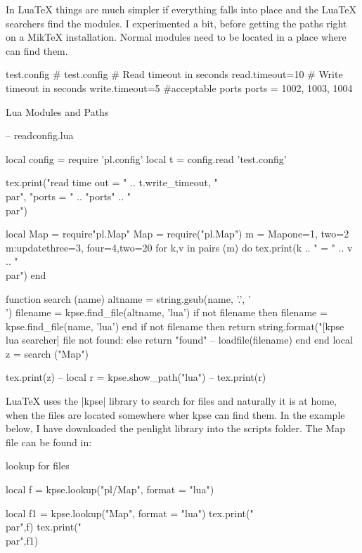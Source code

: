 In LuaTeX things are much simpler if everything falls into place and the LuaTeX searchers find the modules. I experimented a bit, before getting the paths right on a MikTeX installation. Normal modules need to be located in a place where \tex can find them.

\begin{filecontents*}{test.config}
    # test.config
    # Read timeout in seconds
    read.timeout=10
    # Write timeout in seconds
    write.timeout=5
   #acceptable ports
   ports = 1002, 1003, 1004
\end{filecontents*}

\begin{texexample}{Lua Modules and Paths}{}

\begin{luacode}
  -- readconfig.lua
  
local config       = require 'pl.config'
local t               = config.read 'test.config'

tex.print("read time out = " .. t.write_timeout, "\\par",
            "ports = " .. "ports" .. "\\par")

 local Map = require"pl.Map"
 Map = require("pl.Map")
   m = Map{one=1, two=2}
   m:update{three=3, four=4,two=20}
   for k,v in pairs (m) do
       tex.print(k .. " = " .. v .. "\\par")
   end 
   
 function search (name)
    altname = string.gsub(name, '.', '\\')
    filename = kpse.find_file(altname, 'lua')	
    if not filename then
      filename = kpse.find_file(name, 'lua')
    end
    if not filename then
      return string.format("[kpse lua searcher] file not found: %
    else
      return "found" -- loadfile(filename)
    end
end
local z = search ("Map")

tex.print(z)
-- local r = kpse.show_path("lua")
-- tex.print(r)
\end{luacode}
\end{texexample}


LuaTeX uses the |kpse| library to search for files and naturally it is at home, when the files are located somewhere wher kpse can find them. In the example below, I have downloaded the penlight library into the scripts folder. The Map file can be found in:

\begin{texexample}{lookup for files}{}
\begin{luacode}
local f = kpse.lookup("pl/Map", {format = "lua"})

local f1 = kpse.lookup("Map", {format = "lua"})
tex.print("\\par",f)
tex.print("\\par",f1)
\end{luacode}
\end{texexample}

